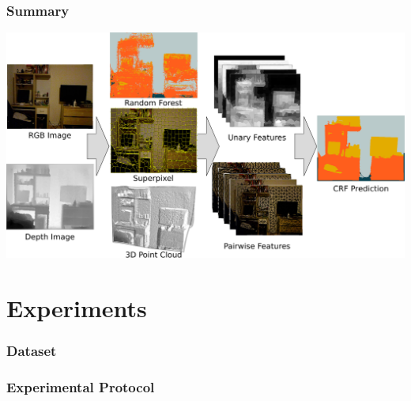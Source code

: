 \documentclass[final,ignorenonframetext,compress]{beamer}
\begin{document}
    \begin{frame}
        \frametitle{Summary}
        \begin{center}
            \includegraphics[width=.9\linewidth]{images/teaser}
        \end{center}
    \end{frame}

    \section{Experiments}
    
    \begin{frame}
        \frametitle{Dataset}
    \end{frame}
    

    \begin{frame}
        \frametitle{Experimental Protocol}
    \end{frame}
\end{document}
